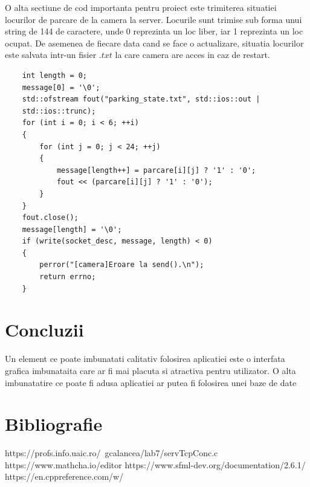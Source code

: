 \documentclass[runningheads]{llncs}
\begin{document}
O alta sectiune de cod importanta pentru proiect este trimiterea situatiei locurilor de parcare de la camera la server. Locurile sunt trimise sub forma unui string de 144 de caractere, unde 0 reprezinta un loc liber, iar 1 reprezinta un loc ocupat. De asemenea de fiecare data cand se face o actualizare, situatia locurilor este salvata intr-un fisier $.txt$ la care camera are acces in caz de restart.
\begin{tcolorbox}[colback=red!5,colframe=red!50!black,width = \linewidth, title = Transmitere situatie locuri de parcare]
\begin{verbatim}
    int length = 0;
    message[0] = '\0';
    std::ofstream fout("parking_state.txt", std::ios::out |
    std::ios::trunc);
    for (int i = 0; i < 6; ++i)
    {
        for (int j = 0; j < 24; ++j)
        {
            message[length++] = parcare[i][j] ? '1' : '0';
            fout << (parcare[i][j] ? '1' : '0');
        }
    }
    fout.close();
    message[length] = '\0';
    if (write(socket_desc, message, length) < 0)
    {
        perror("[camera]Eroare la send().\n");
        return errno;
    }\end{verbatim}
\end{tcolorbox}
\section{Concluzii}

Un element ce poate imbunatati calitativ folosirea aplicatiei este o interfata grafica imbunataita care ar fi mai placuta si atractiva pentru utilizator. O alta imbunatatire ce poate fi adusa aplicatiei ar putea fi folosirea unei baze de date 

\section{Bibliografie}
\begin{thebibliography}{}
    \bibitem{}
    https://profs.info.uaic.ro/~gcalancea/lab7/servTcpConc.c
    \bibitem{}
    https://www.mathcha.io/editor
    \bibitem{}
    https://www.sfml-dev.org/documentation/2.6.1/
    \bibitem{}
    https://en.cppreference.com/w/
    \end{thebibliography}
\end{document}
